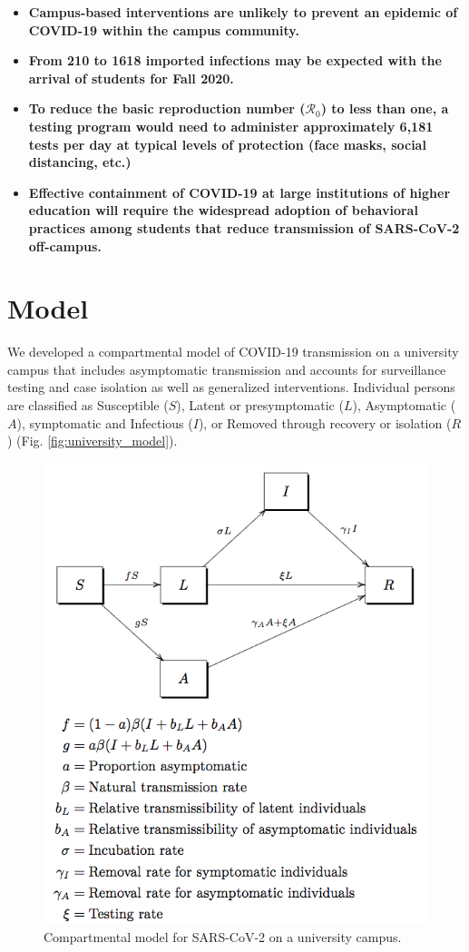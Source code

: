 \documentclass[
]{article}
\providecommand{\tightlist}{%
  \setlength{\itemsep}{0pt}\setlength{\parskip}{0pt}}
\begin{document}
\begin{itemize}
\tightlist
\item
  \textbf{Campus-based interventions are unlikely to prevent an epidemic
  of COVID-19 within the campus community.}
\item
  \textbf{From 210 to 1618 imported infections may be expected with the
  arrival of students for Fall 2020.}
\item
  \textbf{To reduce the basic reproduction number (\(\mathcal{R}_{0}\))
  to less than one, a testing program would need to administer
  approximately 6,181 tests per day at typical levels of protection
  (face masks, social distancing, etc.)}
\item
  \textbf{Effective containment of COVID-19 at large institutions of
  higher education will require the widespread adoption of behavioral
  practices among students that reduce transmission of SARS-CoV-2
  off-campus.}
\end{itemize}

\hypertarget{model}{%
\section{Model}\label{model}}

We developed a compartmental model of COVID-19 transmission on a
university campus that includes asymptomatic transmission and accounts
for surveillance testing and case isolation as well as generalized
interventions. Individual persons are classified as Susceptible (\(S\)),
Latent or presymptomatic (\(L\)), Asymptomatic (\(A\)), symptomatic and
Infectious (\(I\)), or Removed through recovery or isolation (\(R\))
(Fig. \ref{fig:university_model}).

\begin{figure}

{\centering \includegraphics[width=0.7\linewidth]{university_SLAIR} 

}

\caption{\label{fig:university_model}Compartmental model for SARS-CoV-2 on a university campus.}\label{fig:unnamed-chunk-1}
\end{figure}
\end{document}
